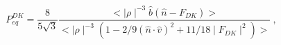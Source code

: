 \begin{equation}\label{DKf}
P_{eq}^{DK}=\frac{8}{5\sqrt{3}}
\frac{<\mid {\rho} \mid ^{-3}\hat {b} (\hat {n}- F_{DK})>}
{<\mid {\rho} \mid ^{-3}(1-2/9(\hat {n}\cdot \hat {v}) ^{2}+11/18
\mid F_{DK} \mid ^{2})>}~,      
\end{equation}

